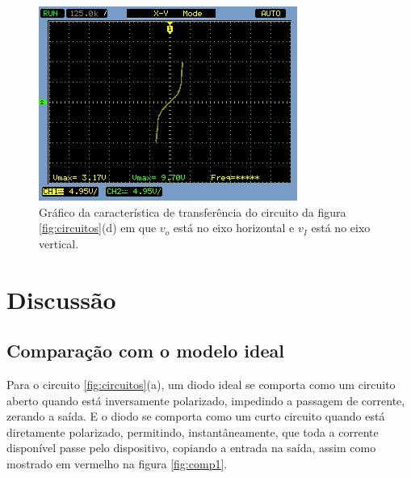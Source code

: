\documentclass{abntex2}
\begin{document}
\begin{figure}[h]
  \centering
  \includegraphics[width=.8\textwidth]{diferenca-1d.png}
  \caption{Gráfico da característica de transferência do circuito da figura \ref{fig:circuitos}(d) em que $v_o$ está no eixo horizontal e $v_I$ está no eixo vertical.}
  \label{fig:diff4}
\end{figure}

\chapter{Discussão}

\section{Comparação com o modelo ideal}
Para o circuito \ref{fig:circuitos}(a), um diodo ideal se comporta como um circuito aberto quando está inversamente polarizado, impedindo a passagem de corrente, zerando a saída. E o diodo se comporta como um curto circuito quando está diretamente polarizado,
permitindo, instantâneamente, que toda a corrente disponível passe pelo dispositivo, copiando a entrada na saída, assim como mostrado em vermelho na figura \ref{fig:comp1}.
\end{document}

